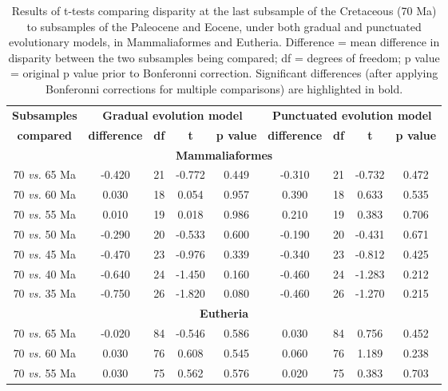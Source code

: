 \documentclass[12pt,letterpaper]{article}
\begin{document}

\begin{table}[ht]
\caption{\tiny{Results of t-tests comparing disparity at the last subsample of the Cretaceous (70 Ma) to subsamples of the Paleocene and Eocene, under both gradual and punctuated evolutionary models, in Mammaliaformes and Eutheria. Difference = mean difference in disparity between the two subsamples being compared; df = degrees of freedom; p value = original p value prior to Bonferonni correction. Significant differences (after applying Bonferonni corrections for multiple comparisons) are highlighted in bold.}}
\label{tab:Tab_beck}
\centering
\begin{tabular}{c|cccc|cccc}
  \hline
  \textbf{Subsamples} & \multicolumn{4}{c|}{\textbf{Gradual evolution model}} & \multicolumn{4}{c}{\textbf{Punctuated evolution model}} \\
  \textbf{compared} & \textbf{difference} & \textbf{df} & \textbf{t} & \textbf{p value} & \textbf{difference} & \textbf{df} & \textbf{t} & \textbf{p value} \\ 
  \hline
  \multicolumn{9}{c}{\textbf{Mammaliaformes}}\\
  \hline
  70 \textit{vs.} 65 Ma & -0.420 & 21 & -0.772 & 0.449 & -0.310 & 21 & -0.732 & 0.472 \\ 
  70 \textit{vs.} 60 Ma & 0.030 & 18 & 0.054 & 0.957 & 0.390 & 18 & 0.633 & 0.535 \\ 
  70 \textit{vs.} 55 Ma & 0.010 & 19 & 0.018 & 0.986 & 0.210 & 19 & 0.383 & 0.706 \\ 
  70 \textit{vs.} 50 Ma & -0.290 & 20 & -0.533 & 0.600 & -0.190 & 20 & -0.431 & 0.671 \\ 
  70 \textit{vs.} 45 Ma & -0.470 & 23 & -0.976 & 0.339 & -0.340 & 23 & -0.812 & 0.425 \\ 
  70 \textit{vs.} 40 Ma & -0.640 & 24 & -1.450 & 0.160 & -0.460 & 24 & -1.283 & 0.212 \\ 
  70 \textit{vs.} 35 Ma & -0.750 & 26 & -1.820 & 0.080 & -0.460 & 26 & -1.270 & 0.215 \\ 
  \hline
  \multicolumn{9}{c}{\textbf{Eutheria}}\\
  \hline
  70 \textit{vs.} 65 Ma & -0.020 & 84 & -0.546 & 0.586 & 0.030 & 84 & 0.756 & 0.452 \\ 
  70 \textit{vs.} 60 Ma &  0.030 & 76 & 0.608 & 0.545 & 0.060 & 76 & 1.189 & 0.238 \\ 
  70 \textit{vs.} 55 Ma &  0.030 & 75 & 0.562 & 0.576 & 0.020 & 75 & 0.383 & 0.703 \\ 

\end{tabular}
\end{table}
\end{document}
